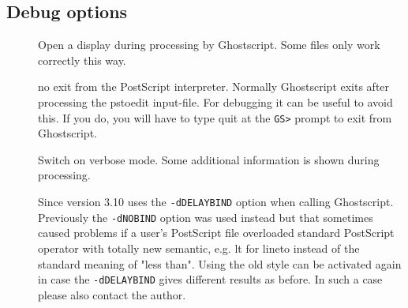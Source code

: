 \documentclass[english,a4paper]{article}
\begin{document}
\subsection{Debug options}
\begin{description}
\item[]
Open a display during processing by Ghostscript. Some files only work correctly this way.


\item[]



\item[]
no exit from the PostScript interpreter. Normally Ghostscript exits after processing the pstoedit input-file. For debugging it can be useful to avoid this. If you do, you will have to type quit at the \verb+GS>+ prompt to exit from Ghostscript.


\item[]
Switch on verbose mode. Some additional information is shown during processing.


\item[]
Since version 3.10  uses the \texttt{-dDELAYBIND} option when calling Ghostscript. Previously the \texttt{-dNOBIND} option was used instead but that sometimes caused problems if a user's PostScript file overloaded standard PostScript operator with totally new semantic, e.g. lt for lineto instead of the standard meaning of "less than". Using  the old style can be activated again in case the \texttt{-dDELAYBIND} gives different results as before. In such a case please also contact the author.


\item[]



\item[]



\item[]



\item[]



\end{description}
\end{document}
